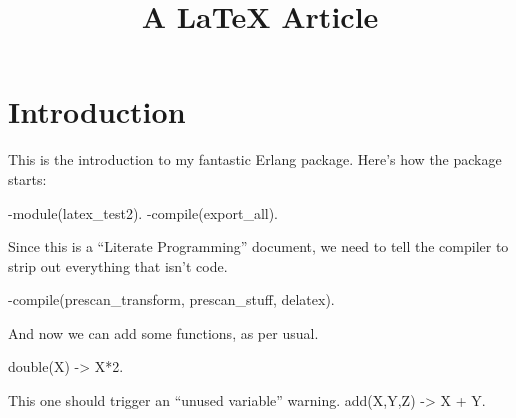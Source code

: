 \documentclass[]{article}
\title{A LaTeX Article}
\author{  }
\date{}
\newenvironment{code}{\footnotesize\verbatim}{\endverbatim\normalsize}
\begin{document}
\ifpdf
{}
\else
{}
\fi

\maketitle


\begin{abstract}
\end{abstract}

\section{Introduction}

This is the introduction to my fantastic Erlang package.  Here's how the package starts:

\begin{code}
	-module(latex_test2).
	-compile(export_all).
\end{code}

Since this is a ``Literate Programming'' document, we need to tell the compiler
to strip out everything that isn't code.

\begin{code}
	-compile({prescan_transform, prescan_stuff, delatex}).
\end{code}

And now we can add some functions, as per usual.

\begin{code}
	double(X) -> X*2.
\end{code}

This one should trigger an ``unused variable'' warning.
\begin{code}
	add(X,Y,Z) -> X + Y.
\end{code}








\end{document}
